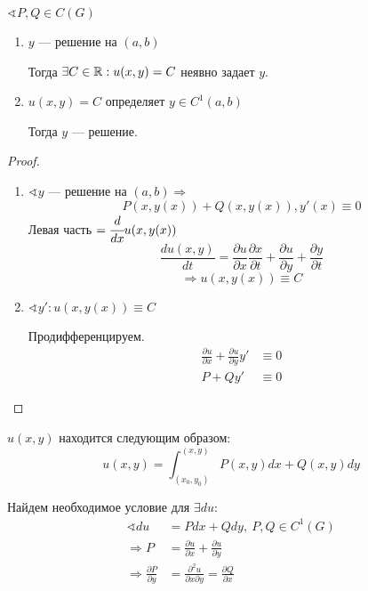 \begin{theorem}\itemfix
    $\sphericalangle P, Q\in C(G)$
    \begin{enumerate}
        \item $y$ --- решение на $(a, b)$

              Тогда $\exists C\in\mathbb{R} : u(x, y)=C$ неявно задает $y$.
        \item $u(x, y)=C$ определяет $y\in C^1(a, b)$

              Тогда $y$ --- решение.
    \end{enumerate}
\end{theorem}
\begin{proof}
    \begin{enumerate}
        \item $\sphericalangle y$ --- решение на $(a, b) \Rightarrow$
              $$P(x, y(x)) + Q(x, y(x)), y'(x) \equiv 0$$
              Левая часть $=\cfrac{d}{dx}u(x, y(x))$
              $$\frac{du(x, y)}{dt} = \frac{\partial u}{\partial x} \frac{\partial x}{\partial t} + \frac{\partial u}{\partial y} + \frac{\partial y}{\partial t}$$
              $$\Rightarrow u(x, y(x)) \equiv C$$
        \item $\sphericalangle y' : u(x, y(x)) \equiv C$

              Продифференцируем.
              \begin{align*}
                  \frac{\partial u}{\partial x} + \frac{\partial u}{\partial y}y' & \equiv 0 \\
                  P + Q y'                                                        & \equiv 0
              \end{align*}
    \end{enumerate}
\end{proof}

$u(x, y)$ находится следующим образом:
$$u(x, y) = \int_{(x_0, y_0)}^{(x, y)} P(x, y)dx + Q(x, y)dy$$

Найдем необходимое условие для $\exists du$:
\begin{align*}
    \sphericalangle du                        & = Pdx + Qdy,\ P, Q\in C^1(G)                                                \\
    \Rightarrow P                             & = \frac{\partial u}{\partial x} + \frac{\partial u}{\partial y}             \\
    \Rightarrow \frac{\partial P}{\partial y} & = \frac{\partial^2 u}{\partial x\partial y} = \frac{\partial Q}{\partial x}
\end{align*}

